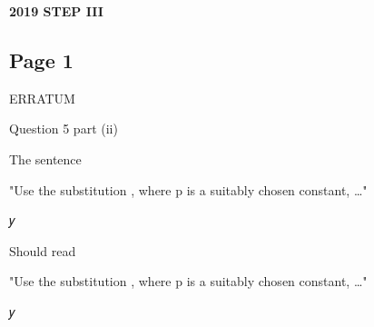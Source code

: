 \documentclass[12pt]{article}
\begin{document}
\begin{center}
{\Large \textbf{2019 STEP III}}
\end{center}

\subsection*{Page 1}
\begin{flushleft}
ERRATUM\par
Question 5 part (ii)\par
The sentence\par
"Use the substitution , where p is a suitably chosen constant, …"\par
𝑦\par
Should read\par
"Use the substitution , where p is a suitably chosen constant, …"\par
𝑦\par
\end{flushleft}
\end{document}
